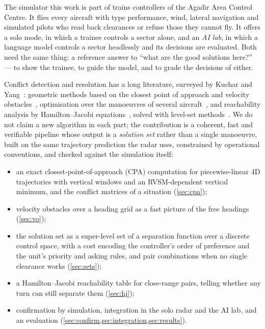 \documentclass[11pt,a4paper]{article}
\begin{document}
The simulator this work is part of trains controllers of the Agadir Area Control Centre. It flies every aircraft
with type performance, wind, lateral navigation and simulated pilots who read back clearances or refuse those they
cannot fly. It offers a solo mode, in which a trainee controls a sector alone, and an \emph{AI lab}, in which a
language model controls a sector headlessly and its decisions are evaluated. Both need the same thing: a reference
answer to ``what are the good solutions here?'' --- to show the trainee, to guide the model, and to grade the
decisions of either.

Conflict detection and resolution has a long literature, surveyed by Kuchar and Yang~\cite{kuchar2000}: geometric
methods based on the closest point of approach and velocity obstacles~\cite{fiorini1998,hoekstra2002}, optimisation
over the manoeuvres of several aircraft~\cite{pallottino2002,durand1996}, and reachability analysis by
Hamilton--Jacobi equations~\cite{mitchell2005,tomlin1998}, solved with level-set methods~\cite{osher2003}. We do not claim a new algorithm in each part; the contribution is a coherent, fast and verifiable
pipeline whose output is a \emph{solution set} rather than a single manoeuvre, built on the same trajectory
prediction the radar uses, constrained by operational conventions, and checked against the simulation itself:
\begin{itemize}
\item an exact closest-point-of-approach (CPA) computation for piecewise-linear 4D trajectories with vertical
windows and an RVSM-dependent vertical minimum, and the conflict matrices of a situation (\cref{sec:cpa});
\item velocity obstacles over a heading grid as a fast picture of the free headings (\cref{sec:vo});
\item the solution set as a super-level set of a separation function over a discrete control space, with a cost
encoding the controller's order of preference and the unit's priority and asking rules, and pair combinations
when no single clearance works (\cref{sec:sets});
\item a Hamilton--Jacobi reachability table for close-range pairs, telling whether any turn can still separate them
(\cref{sec:hj});
\item confirmation by simulation, integration in the solo radar and the AI lab, and an evaluation
(\cref{sec:confirm,sec:integration,sec:results}).
\end{itemize}
\end{document}
